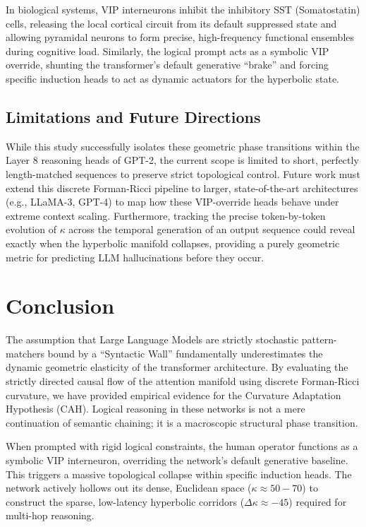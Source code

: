\documentclass[11pt, a4paper]{article}
\begin{document}
In biological systems, VIP interneurons inhibit the inhibitory SST (Somatostatin) cells, releasing the local cortical circuit from its default suppressed state and allowing pyramidal neurons to form precise, high-frequency functional ensembles during cognitive load. Similarly, the logical prompt acts as a symbolic VIP override, shunting the transformer's default generative ``brake'' and forcing specific induction heads to act as dynamic actuators for the hyperbolic state.

\subsection{Limitations and Future Directions}
While this study successfully isolates these geometric phase transitions within the Layer 8 reasoning heads of GPT-2, the current scope is limited to short, perfectly length-matched sequences to preserve strict topological control. Future work must extend this discrete Forman-Ricci pipeline to larger, state-of-the-art architectures (e.g., LLaMA-3, GPT-4) to map how these VIP-override heads behave under extreme context scaling. Furthermore, tracking the precise token-by-token evolution of $\kappa$ across the temporal generation of an output sequence could reveal exactly when the hyperbolic manifold collapses, providing a purely geometric metric for predicting LLM hallucinations before they occur.

\section{Conclusion}
The assumption that Large Language Models are strictly stochastic pattern-matchers bound by a ``Syntactic Wall'' fundamentally underestimates the dynamic geometric elasticity of the transformer architecture. By evaluating the strictly directed causal flow of the attention manifold using discrete Forman-Ricci curvature, we have provided empirical evidence for the Curvature Adaptation Hypothesis (CAH). Logical reasoning in these networks is not a mere continuation of semantic chaining; it is a macroscopic structural phase transition.

When prompted with rigid logical constraints, the human operator functions as a symbolic VIP interneuron, overriding the network's default generative baseline. This triggers a massive topological collapse within specific induction heads. The network actively hollows out its dense, Euclidean space ($\kappa \approx 50-70$) to construct the sparse, low-latency hyperbolic corridors ($\Delta\kappa \approx -45$) required for multi-hop reasoning.
\end{document}
